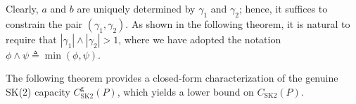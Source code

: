 \documentclass[12pt]{article}
\begin{document}
Clearly, $a$ and $b$ are uniquely determined by $\gamma_1$ and $\gamma_2$; hence, it suffices to constrain the pair $(\gamma_1,\gamma_2)$. As shown in the following theorem, it is natural to require that $|\gamma_1|\wedge|\gamma_2| >1$, where we have adopted the notation $\phi\wedge \psi\triangleq \min(\phi,\psi)$.

The following theorem provides a closed-form characterization of the genuine SK(2) capacity $C^\mathrm{g}_\mathrm{SK2}(P)$, which yields a lower bound on $C_\mathrm{SK2}(P)$.
\end{document}
